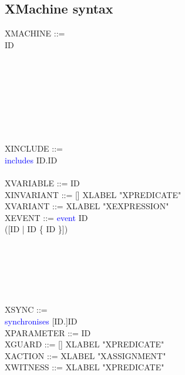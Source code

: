 \subsection{XMachine syntax}
\label{sec:xmachine-syntax}
\begin{center}
  \begin{Bcode}
    XMACHINE ::= \\
    \Btab \Btab \Bmachine{} ID \\
    \Btab {}\\
    \Btab \Btab [\Brefines{} ID]\\
    \Btab \Btab [\Bsees{} ID \{ ID \}]\\
    \Btab {}\\
    \Btab {}\\
    \Btab {}\\
    \Btab {} \\
    \Btab \Btab \Bend \\
    XINCLUDE ::= \\
    \Btab \Btab \textcolor{blue}{includes} ID.ID\\
    \Btab {}\\
    XVARIABLE ::= ID \\
    XINVARIANT ::= [\Btheorem] XLABEL "XPREDICATE" \\
    XVARIANT ::= XLABEL "XEXPRESSION" \\
    XEVENT ::= 
    \Btab \Btab [\Bordinary | \Bconvergent | \Banticipated] \textcolor{blue}{event} ID \\
    \Btab \Btab ([\Bextended ID | \Brefines{} ID \{ ID \}])\\
    \Btab \Btab {}\\
    \Btab {}\\
    \Btab \Btab {}\\
    \Btab \Btab {} \\
    \Btab \Btab {} \\
    \Btab \Btab \Bend\\
    XSYNC ::= \\
    \Btab \Btab \textcolor{blue}{synchronises} [ID.]ID\\
    XPARAMETER ::= ID \\
    XGUARD ::=  [\Btheorem] XLABEL "XPREDICATE"\\
    XACTION ::= XLABEL "XASSIGNMENT"\\
    XWITNESS ::= XLABEL "XPREDICATE" \\
  \end{Bcode}
\end{center}

